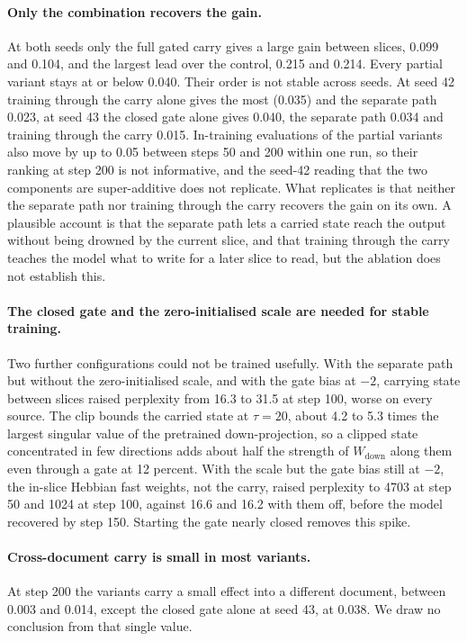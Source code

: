 \documentclass[12pt,a4paper]{report}
\begin{document}
\paragraph{Only the combination recovers the gain.} At both seeds only the full gated carry gives a large gain between slices, 0.099 and 0.104, and the largest lead over the control, 0.215 and 0.214. Every partial variant stays at or below 0.040. Their order is not stable across seeds. At seed 42 training through the carry alone gives the most (0.035) and the separate path 0.023, at seed 43 the closed gate alone gives 0.040, the separate path 0.034 and training through the carry 0.015. In-training evaluations of the partial variants also move by up to 0.05 between steps 50 and 200 within one run, so their ranking at step 200 is not informative, and the seed-42 reading that the two components are super-additive does not replicate. What replicates is that neither the separate path nor training through the carry recovers the gain on its own. A plausible account is that the separate path lets a carried state reach the output without being drowned by the current slice, and that training through the carry teaches the model what to write for a later slice to read, but the ablation does not establish this.

\paragraph{The closed gate and the zero-initialised scale are needed for stable training.} Two further configurations could not be trained usefully. With the separate path but without the zero-initialised scale, and with the gate bias at $-2$, carrying state between slices raised perplexity from 16.3 to 31.5 at step 100, worse on every source. The clip bounds the carried state at $\tau = 20$, about 4.2 to 5.3 times the largest singular value of the pretrained down-projection, so a clipped state concentrated in few directions adds about half the strength of $W_{\mathrm{down}}$ along them even through a gate at 12 percent. With the scale but the gate bias still at $-2$, the in-slice Hebbian fast weights, not the carry, raised perplexity to 4703 at step 50 and 1024 at step 100, against 16.6 and 16.2 with them off, before the model recovered by step 150. Starting the gate nearly closed removes this spike.

\paragraph{Cross-document carry is small in most variants.} At step 200 the variants carry a small effect into a different document, between 0.003 and 0.014, except the closed gate alone at seed 43, at 0.038. We draw no conclusion from that single value.
\end{document}
